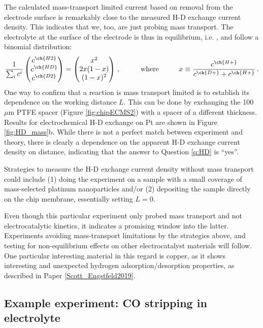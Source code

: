 The calculated mass-transport limited current based on  removal from the electrode surface is remarkably close to the measured H-D exchange current density. This indicates that we, too, are just probing mass transport. The electrolyte at the surface of the electrode is thus in equilibrium, i.e. ,  and  follow a binomial distribution:
\begin{equation}
\frac{1}{\sum_i c^i}\begin{pmatrix}
c^{\ch{H2}}\\c^{\ch{HD}}\\c^{\ch{D2}}
\end{pmatrix}
= \begin{pmatrix}
x^2\\ 2x(1-x)\\ (1-x)^2
\end{pmatrix}\,,\hspace{1cm}\text{where}\hspace{1cm}
x \equiv \frac{c^{\ch{H+}}}{c^{\ch{D+}} + c^{\ch{H+}}}\,.
\end{equation}
One way to confirm that a reaction is mass transport limited is to establish its dependence on the working distance $L$. This can be done by exchanging the 100 $\mu$m PTFE spacer (Figure \ref{fig:chipECMS2}) with a spacer of a different thickness. Results for electrochemical H-D exchange on Pt are shown in Figure \ref{fig:HD_mass}b. While there is not a perfect match between experiment and theory, there is clearly a dependence on the apparent H-D exchange current density on distance, indicating that the answer to Question \ref{q:HD} is ``yes''.

Strategies to measure the H-D exchange current density without mass transport could include (1) doing the experiment on a sample with a small coverage of mass-selected platinum nanoparticles and/or (2) depositing the sample directly on the chip membrane, essentially setting $L=0$.

Even though this particular experiment only probed mass transport and not electrocatalytic kinetics, it indicates a promising window into the latter. Experiments avoiding mass-transport limitations by the strategies above, and testing for non-equilibrium effects on other electrocatalyst materials will follow. One particular interesting material in this regard is copper, as it shows interesting and unexpected hydrogen adsorption/desorption properties, as described in Paper \ref{Scott_Engstfeld2019}.


\subsection{Example experiment: CO stripping in  electrolyte}\label{subsec:isotope_CO2}

